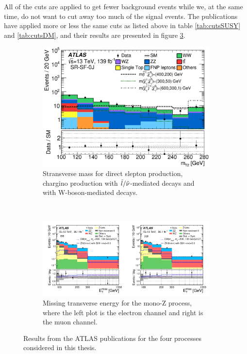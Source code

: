 All of the cuts are applied to get fewer background events while we, at the same time, do not want to cut away too much of the signal events. The publications have applied more or less the same cuts as listed above in table \ref{tab:cutsSUSY} and \ref{tab:cutsDM}, and their results are presented in figure \ref{fig:atlaspub}.


\begin{figure}[H]
\centering
    \begin{subfigure}[H]{0.49\textwidth}
        \includegraphics[width=\textwidth]{Figures/FromOnline/atlasmt2SUSY.png}
    \caption{Stransverse mass for direct slepton production, chargino production with $\Tilde{l}/\Tilde{\nu}$-mediated decays and with W-boson-mediated decays.}
    \label{fig:atlasSUSY}
    \end{subfigure}
    \\
    \begin{subfigure}[H]{\textwidth}
        \includegraphics[width=\textwidth]{Figures/FromOnline/atlasmetDM.png}
    \caption{Missing transverse energy for the mono-Z process, where the left plot is the electron channel and right is the muon channel.}
    \label{fig:atlasDM}
    \end{subfigure}
    \caption{Results from the ATLAS publications for the four processes considered in this thesis.}
    \label{fig:atlaspub}
\end{figure}


